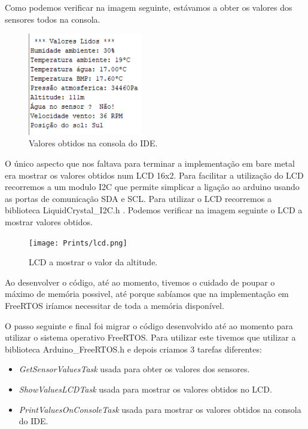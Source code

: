 \documentclass[11pt]{report}
\begin{document}
Como podemos verificar na imagem seguinte, estávamos a obter os valores dos sensores todos na consola.


\begin{figure} [!h]
\centering
\includegraphics[width=50mm]{Prints/valores_consola.png}
\caption{Valores obtidos na consola do IDE.}
\end{figure}

O único aspecto que nos faltava para terminar a implementação em bare metal era mostrar os valores obtidos num LCD 16x2. Para facilitar a utilização do LCD recorremos a um modulo I2C que permite simplicar a ligação ao arduino usando as portas de comunicação SDA e SCL. Para utilizar o LCD recorremos a biblioteca LiquidCrystal\_I2C.h \cite{lcdbiblio}.  Podemos verificar na imagem seguinte o LCD a mostrar valores obtidos.


\begin{figure} [!h]
\centering
\texttt{[image: Prints/lcd.png]}
\caption{LCD a mostrar o valor da altitude.}
\end{figure}

Ao desenvolver o código, até ao momento, tivemos o cuidado de poupar o máximo de memória possivel, até porque sabíamos que na implementação em FreeRTOS iríamos necessitar de toda a memória disponível. \cite{memoria}

O passo seguinte e final foi migrar o código desenvolvido até ao momento para utilizar o sistema operativo FreeRTOS. Para utilizar este tivemos que utilizar a biblioteca Arduino\_FreeRTOS.h \cite{rtos} e depois criamos 3 tarefas diferentes:

\begin{itemize}

\item \textit{GetSensorValuesTask} usada para obter os valores dos sensores.

\item \textit{ShowValuesLCDTask} usada para mostrar os valores obtidos no LCD.

\item \textit{PrintValuesOnConsoleTask} usada para mostrar os valores obtidos na consola do IDE.

\end{itemize}
\end{document}
